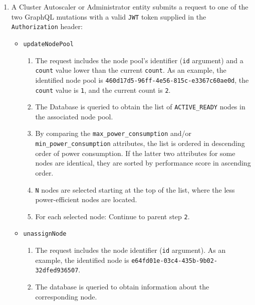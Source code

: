 \begin{enumerate}
  \item A Cluster Autoscaler or Administrator entity submits a request to one of
    the two GraphQL mutations with a valid \texttt{JWT} token supplied in the
    \texttt{Authorization} header:
    \begin{itemize}
      \item \texttt{updateNodePool}
        \begin{enumerate}
          \item The request includes the node pool's identifier (\texttt{id} argument)
            and a \texttt{count} value lower than the current \texttt{count}.
            \newline
            As an example, the identified node pool is \texttt{460d17d5-96ff-4e56-815c-e3367c60ae0d},
            the \texttt{count} value is \texttt{1}, and the current count is \texttt{2}.

          \item The Database is queried to obtain the list of \texttt{ACTIVE\_READY}
            nodes in the associated node pool.

          \item By comparing the \texttt{max\_power\_consumption} and/or \texttt{min\_power\_consumption}
            attributes, the list is ordered in descending order of power
            consumption. If the latter two attributes for some nodes are identical,
            they are sorted by performance score in ascending order.

          \item \texttt{N} nodes are selected starting at the top of the list, where
            the less power-efficient nodes are located.

          \item For each selected node: Continue to parent step \texttt{2}.
        \end{enumerate}

      \item \texttt{unassignNode}
        \begin{enumerate}
          \item The request includes the node identifier (\texttt{id} argument).
            \newline
            As an example, the identified node is \texttt{e64fd01e-03c4-435b-9b02-32dfed936507}.

          \item The database is queried to obtain information about the corresponding
            node.


\end{enumerate}
\end{itemize}
\end{enumerate}
